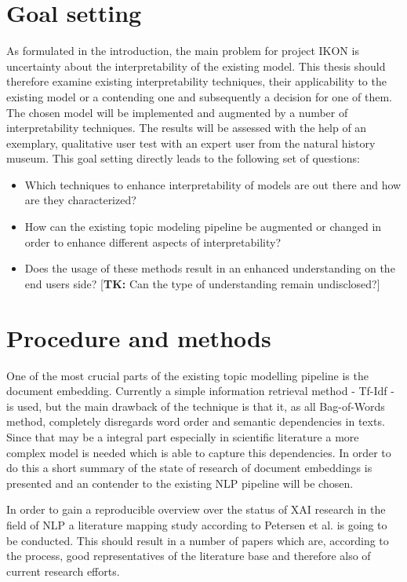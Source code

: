 \documentclass[pdftex,a4paper,12pt]{scrartcl}
\newcommand{\tk}[1]{\textcolor{tim}{[\textbf{TK:} #1]}}
\begin{document}
\section{Goal setting} 
As formulated in the introduction, the main problem for project IKON is uncertainty about the interpretability of the existing model. This thesis should therefore examine existing interpretability techniques, their applicability to the existing model or a contending one and subsequently a decision for one of them. The chosen model will be implemented and augmented by a number of interpretability techniques. The results will be assessed with the help of an exemplary, qualitative user test with an expert user from the natural history museum. This goal setting directly leads to the following set of questions:
\begin{itemize}
	\item Which techniques to enhance interpretability of models are out there and how are they characterized?
	\item How can the existing topic modeling pipeline be augmented or changed in order to enhance different aspects of interpretability?
	\item Does the usage of these methods result in an enhanced understanding on the end users side? \tk{Can the type of understanding remain undisclosed?}
\end{itemize}



\section{Procedure and methods}

One of the most crucial parts of the existing topic modelling pipeline is the document embedding. Currently a simple information retrieval method - Tf-Idf - is used, but the main drawback of the technique is that it, as all Bag-of-Words method, completely disregards word order and semantic dependencies in texts. Since that may be a integral part especially in scientific literature a more complex model is needed which is able to capture this dependencies. In order to do this a short summary of the state of research of document embeddings is presented and an contender to the existing NLP pipeline will be chosen. 

In order to gain a reproducible overview over the status of XAI research in the field of NLP a literature mapping study according to Petersen et al. \cite{petersenSystematicMappingStudies} is going to be conducted. This should result in a number of papers which are, according to the process, good representatives of the literature base and therefore also of current research efforts. 
\end{document}
